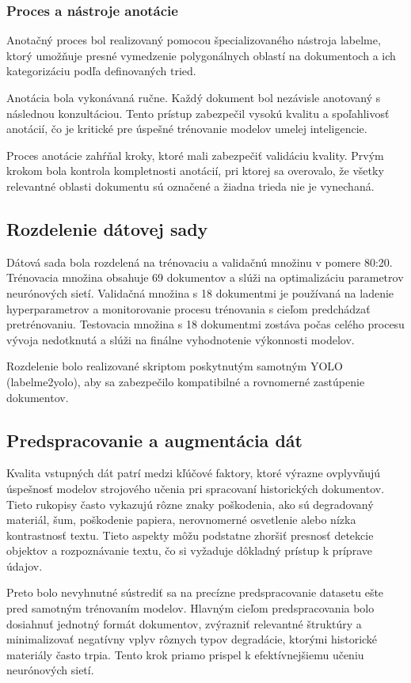         \subsubsection{Proces a nástroje anotácie}
        Anotačný proces bol realizovaný pomocou špecializovaného nástroja labelme, ktorý umožňuje presné vymedzenie polygonálnych oblastí na dokumentoch a ich kategorizáciu podľa definovaných tried.
        
        Anotácia bola vykonávaná ručne. Každý dokument bol nezávisle anotovaný s následnou konzultáciou. Tento prístup zabezpečil vysokú kvalitu a spoľahlivosť anotácií, čo je kritické pre úspešné trénovanie modelov umelej inteligencie.
        
        Proces anotácie zahŕňal kroky, ktoré mali zabezpečiť validáciu kvality. Prvým krokom bola kontrola kompletnosti anotácií, pri ktorej sa overovalo, že všetky relevantné oblasti dokumentu sú označené a žiadna trieda nie je vynechaná.
    \subsection{Rozdelenie dátovej sady}
    Dátová sada bola rozdelená na trénovaciu a validačnú množinu v pomere 80:20. Trénovacia množina obsahuje 69 dokumentov a slúži na optimalizáciu parametrov neurónových sietí. Validačná množina s 18 dokumentmi je používaná na ladenie hyperparametrov a monitorovanie procesu trénovania s cieľom predchádzať pretrénovaniu. Testovacia množina s 18 dokumentmi zostáva počas celého procesu vývoja nedotknutá a slúži na finálne vyhodnotenie výkonnosti modelov.
    
    Rozdelenie bolo realizované skriptom poskytnutým samotným YOLO (labelme2yolo), aby sa zabezpečilo kompatibilné a rovnomerné zastúpenie dokumentov.
    \subsection{Predspracovanie a augmentácia dát}
    Kvalita vstupných dát patrí medzi kľúčové faktory, ktoré výrazne ovplyvňujú úspešnosť modelov strojového učenia pri spracovaní historických dokumentov. Tieto rukopisy často vykazujú rôzne znaky poškodenia, ako sú degradovaný materiál, šum, poškodenie papiera, nerovnomerné osvetlenie alebo nízka kontrastnosť textu. Tieto aspekty môžu podstatne zhoršiť presnosť detekcie objektov a rozpoznávanie textu, čo si vyžaduje dôkladný prístup k príprave údajov.

    Preto bolo nevyhnutné sústrediť sa na precízne predspracovanie datasetu ešte pred samotným trénovaním modelov. Hlavným cieľom predspracovania bolo dosiahnuť jednotný formát dokumentov, zvýrazniť relevantné štruktúry a minimalizovať negatívny vplyv rôznych typov degradácie, ktorými historické materiály často trpia. Tento krok priamo prispel k efektívnejšiemu učeniu neurónových sietí.

